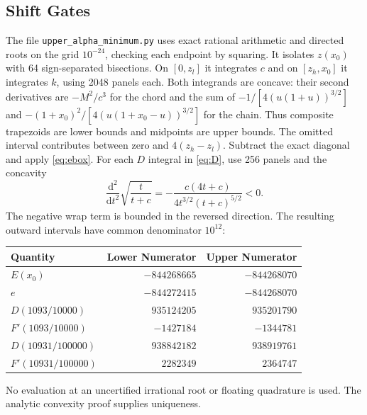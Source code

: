 \documentclass[11pt,letterpaper]{article}
\begin{document}
\subsection{Shift Gates}
The file \texttt{upper\_alpha\_minimum.py} uses exact rational arithmetic
and directed roots on the grid $10^{-24}$, checking each endpoint by
squaring. It isolates $z(x_0)$ with 64 sign-separated bisections.
On $[0,z_l]$ it integrates $c$ and on $[z_h,x_0]$ it integrates $k$,
using 2048 panels each. Both integrands are concave: their second
derivatives are $-M^2/c^3$ for the chord and the sum of
$-1/[4(u(1+u))^{3/2}]$ and
$-(1+x_0)^2/[4(u(1+x_0-u))^{3/2}]$ for the chain.
Thus composite trapezoids are lower bounds and midpoints are upper bounds.
The omitted interval contributes between zero and $4(z_h-z_l)$.
Subtract the exact diagonal and apply \eqref{eq:ebox}.
For each $D$ integral in \eqref{eq:D}, use 256 panels and the concavity
\[
 \frac{\mathrm d^2}{\mathrm dt^2}\sqrt{\frac t{t+c}}
 =-\frac{c(4t+c)}{4t^{3/2}(t+c)^{5/2}}<0.
\]
The negative wrap term is bounded in the reversed direction.
The resulting outward intervals have common denominator $10^{12}$:
\begin{center}
\begin{tabular}{lrr}\toprule
Quantity & Lower Numerator & Upper Numerator\\\midrule
$E(x_0)$ & $-844268665$ & $-844268070$\\
$e$ & $-844272415$ & $-844268070$\\
$D(1093/10000)$ & $935124205$ & $935201790$\\
$F'(1093/10000)$ & $-1427184$ & $-1344781$\\
$D(10931/100000)$ & $938842182$ & $938919761$\\
$F'(10931/100000)$ & $2282349$ & $2364747$\\\bottomrule
\end{tabular}
\end{center}
No evaluation at an uncertified irrational root or floating quadrature
is used. The analytic convexity proof supplies uniqueness.
\end{document}
